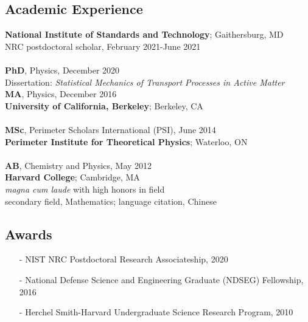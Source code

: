 \documentclass[]{article}
\begin{document}
\subsection*{Academic Experience}
\textbf{National Institute of Standards and Technology}; Gaithersburg, MD\\
NRC postdoctoral scholar, February 2021-June 2021\\
\\
\textbf{PhD}, Physics, December 2020\\
Dissertation: \textit{Statistical Mechanics of Transport Processes in Active Matter}\\
\textbf{MA}, Physics, December 2016\\
\textbf{University of California, Berkeley}; Berkeley, CA\\
\\
\textbf{MSc}, Perimeter Scholars International (PSI), June 2014\\
\textbf{Perimeter Institute for Theoretical Physics}; Waterloo, ON\\
\\
\textbf{AB}, Chemistry and Physics, May 2012\\
\textbf{Harvard College}; Cambridge, MA\\
\textit{magna cum laude} with high honors in field\\
secondary field, Mathematics; language citation, Chinese


\subsection*{Awards}
\begin{itemize}
	\item[-] NIST NRC Postdoctoral Research Associateship, 2020
	\item[-] National Defense Science and Engineering Graduate (NDSEG) Fellowship, 2016
	\item[-] Herchel Smith-Harvard Undergraduate Science Research Program, 2010
\end{itemize}
\end{document}
